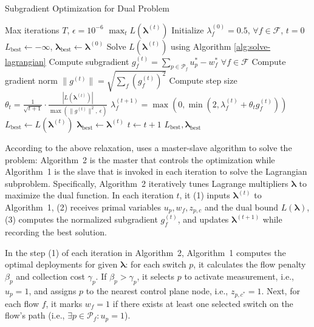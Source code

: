 \begin{algorithm}[t]
\caption{Subgradient Optimization for Dual Problem}
\label{alg:subgradient}
\begin{algorithmic}[1]
\footnotesize
\Require Max iterations \(T\), \(\epsilon = 10^{-6}\)
\Ensure \(\max_t L(\boldsymbol{\lambda}^{(t)})\)
\State Initialize \(\lambda_f^{(0)} = 0.5\), \(\forall f \in \mathcal{F}\), \(t = 0\)
\State \(L_{\text{best}} \leftarrow -\infty\), \(\boldsymbol{\lambda}_{\text{best}} \leftarrow \boldsymbol{\lambda}^{(0)}\)
  \State Solve \(L(\boldsymbol{\lambda}^{(t)})\) using Algorithm \ref{alg:solve-lagrangian}
  \State Compute subgradient $g_f^{(t)} = \sum_{p \in \mathcal{P}_f} u_p^* - w_f^*$ $\forall f \in \mathcal{F}$
  \State Compute gradient norm \(\|g^{(t)}\| = \sqrt{\sum_f (g_f^{(t)})^2}\)
  \State Compute step size \(\theta_t = \frac{1}{\sqrt{t+1}} \cdot \frac{|L(\boldsymbol{\lambda}^{(t)})|}{\max(\|g^{(t)}\|^2,\ \epsilon)}\)
    \State \(\lambda_f^{(t+1)} = \max\left(0, \min\left(2, \lambda_f^{(t)} + \theta_t g_f^{(t)}\right)\right)\) 
  \EndFor
    \State \(L_{\text{best}} \leftarrow L(\boldsymbol{\lambda}^{(t)})\)
    \State \(\boldsymbol{\lambda}_{\text{best}} \leftarrow \boldsymbol{\lambda}^{(t)}\)
  \EndIf
  \State $t \leftarrow t + 1$
\EndWhile
\State \Return \(L_{\text{best}}, \boldsymbol{\lambda}_{\text{best}}\)
\end{algorithmic}
\end{algorithm}

According to the above relaxation, \sysname uses a master-slave algorithm to solve the problem: Algorithm~2 is the master that controls the optimization while Algorithm~1 is the slave that is invoked in each iteration to solve the Lagrangian subproblem. Specifically, Algorithm~2 iteratively tunes Lagrange multipliers $\boldsymbol{\lambda}$ to maximize the dual function. In each iteration $t$, it (1) inputs $\boldsymbol{\lambda}^{(t)}$ to Algorithm~1, (2) receives primal variables $u_p, w_f, z_{p,c}$ and the dual bound $L(\boldsymbol{\lambda})$, (3) computes the normalized subgradient $g_f^{(t)}$, and updates $\boldsymbol{\lambda}^{(t+1)}$ while recording the best solution.

In the step (1) of each iteration in Algorithm~2, Algorithm~1 computes the optimal deployments for given $\boldsymbol{\lambda}$: for each switch $p$, it calculates the flow penalty $\beta_p$ and collection cost $\gamma_p$. If $\beta_p > \gamma_p$, it selects $p$ to activate measurement, i.e., $u_p=1$, and assigns $p$ to the nearest control plane node, i.e., $z_{p,c^*}=1$. Next, for each flow $f$, it marks $w_f=1$ if there exists at least one selected switch on the flow's path (i.e., $\exists p \in \mathcal{P}_f: u_p=1$).

